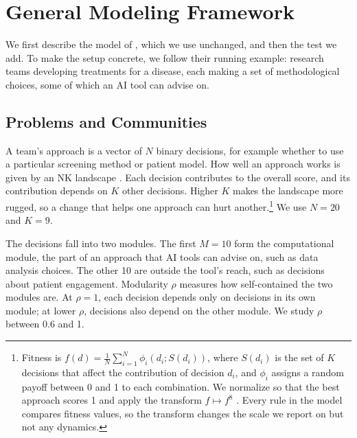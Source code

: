 \documentclass[11pt]{article}
\begin{document}
\section{General Modeling Framework}
\label{sec:model}

We first describe the model of \citet{fazelpour2026navigating}, which we use unchanged, and then the test we add. To make the setup concrete, we follow their running example: research teams developing treatments for a disease, each making a set of methodological choices, some of which an AI tool can advise on.

\subsection{Problems and Communities}

A team's approach is a vector of $N$ binary decisions, for example whether to use a particular screening method or patient model. How well an approach works is given by an NK landscape \citep{kauffman1987towards}. Each decision contributes to the overall score, and its contribution depends on $K$ other decisions. Higher $K$ makes the landscape more rugged, so a change that helps one approach can hurt another.\footnote{Fitness is $f(d) = \frac{1}{N}\sum_{i=1}^{N}\phi_i(d_i; S(d_i))$, where $S(d_i)$ is the set of $K$ decisions that affect the contribution of decision $d_i$, and $\phi_i$ assigns a random payoff between 0 and 1 to each combination. We normalize so that the best approach scores 1 and apply the transform $f \mapsto f^{8}$ \citep{lazer2007network}. Every rule in the model compares fitness values, so the transform changes the scale we report on but not any dynamics.} We use $N=20$ and $K=9$.

The decisions fall into two modules. The first $M=10$ form the computational module, the part of an approach that AI tools can advise on, such as data analysis choices. The other 10 are outside the tool's reach, such as decisions about patient engagement. Modularity $\rho$ measures how self-contained the two modules are. At $\rho=1$, each decision depends only on decisions in its own module; at lower $\rho$, decisions also depend on the other module. We study $\rho$ between 0.6 and 1.
\end{document}
